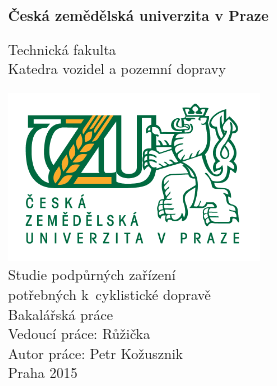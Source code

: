 \documentclass[a4paper,11pt]{article}
\begin{document}
\begin{titlepage}
    \begin{center}
        \vspace*{1cm}
        
        \textbf{Česká zemědělská univerzita v Praze}
        
        \vspace{0.5cm}
        Technická fakulta\\
        \vspace{0.5cm}
        Katedra vozidel a pozemní dopravy\\

        
        \vspace{0.8cm}
        
        \includegraphics[width=0.5\textwidth]{./logo}
        \vspace{0.8cm}\\
        Studie podpůrných zařízení\\
        potřebných k~cyklistické dopravě\\
        \vspace{0.5cm}
        Bakalářská práce\\
        
        \vfill              
	    Vedoucí práce: Růžička\\
        \vspace{0.5cm}
        Autor práce: Petr Kožusznik\\ 
        \vspace{0.5cm}
        Praha 2015\\
        
    \end{center}
\end{titlepage}

\tableofcontents
\newpage
\end{document}
